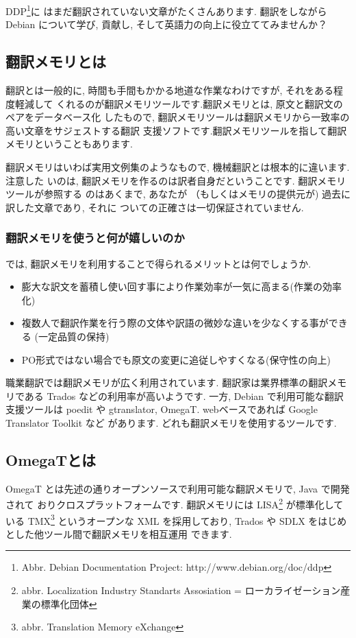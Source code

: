 \documentclass[mingoth,a4paper]{jsarticle}
\begin{document}
DDP\footnote{Abbr. Debian Documentation Project: http://www.debian.org/doc/ddp}に
はまだ翻訳されていない文章がたくさんあります. 翻訳をしながら Debian について学び,
 貢献し, そして英語力の向上に役立ててみませんか？

\subsection{翻訳メモリとは}
翻訳とは一般的に, 時間も手間もかかる地道な作業なわけですが, それをある程度軽減して
くれるのが翻訳メモリツールです.翻訳メモリとは, 原文と翻訳文のペアをデータベース化
したもので, 翻訳メモリツールは翻訳メモリから一致率の高い文章をサジェストする翻訳
支援ソフトです.翻訳メモリツールを指して翻訳メモリということもあります.

翻訳メモリはいわば実用文例集のようなもので, 機械翻訳とは根本的に違います.注意した
いのは, 翻訳メモリを作るのは訳者自身だということです. 翻訳メモリツールが参照する
のはあくまで, あなたが （もしくはメモリの提供元が) 過去に訳した文章であり, それに
ついての正確さは一切保証されていません.

\subsubsection{翻訳メモリを使うと何が嬉しいのか}
では, 翻訳メモリを利用することで得られるメリットとは何でしょうか.
\begin{itemize}
	\item 膨大な訳文を蓄積し使い回す事により作業効率が一気に高まる(作業の効率化)
	\item 複数人で翻訳作業を行う際の文体や訳語の微妙な違いを少なくする事ができる
	      (一定品質の保持)
	\item PO形式ではない場合でも原文の変更に追従しやすくなる(保守性の向上)
\end{itemize}

職業翻訳では翻訳メモリが広く利用されています. 翻訳家は業界標準の翻訳メモリである
 Trados などの利用率が高いようです. 一方, Debian で利用可能な翻訳支援ツールは
 poedit や gtranslator, OmegaT. webベースであれば Google Translator Toolkit など
があります. どれも翻訳メモリを使用するツールです.

\subsection{OmegaTとは}
OmegaT とは先述の通りオープンソースで利用可能な翻訳メモリで, Java で開発されて
おりクロスプラットフォームです. 翻訳メモリには LISA\footnote{abbr. Localization
Industry Standarts Assosiation = ローカライゼーション産業の標準化団体}
が標準化している TMX\footnote{abbr. Translation Memory eXchange} というオープンな
XML を採用しており, Trados や SDLX をはじめとした他ツール間で翻訳メモリを相互運用
できます.
\end{document}
